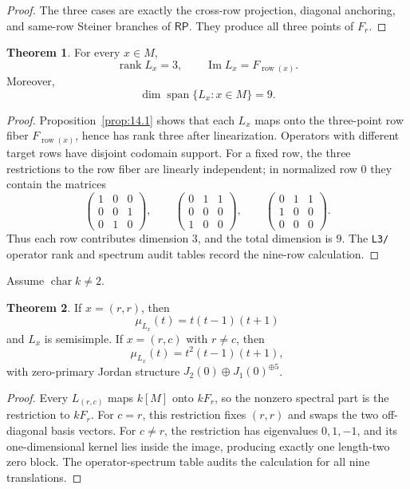 \documentclass[11pt]{article}
\theoremstyle{definition}
\newtheorem{theorem}{Theorem}[section]
\newcommand{\RP}{\mathsf{RP}}
\begin{document}
\begin{proof}
The three cases are exactly the cross-row projection, diagonal anchoring, and
same-row Steiner branches of \(\RP\).  They produce all three points of
\(F_r\).
\end{proof}

\begin{theorem}
\label{thm:14.2}
For every \(x\in M\),
\[
\operatorname{rank}L_x=3,
\qquad
\operatorname{Im}L_x=F_{\operatorname{row}(x)}.
\]
Moreover,
\[
\dim\operatorname{span}\{L_x:x\in M\}=9.
\]
\end{theorem}

\begin{proof}
Proposition~\ref{prop:14.1} shows that each \(L_x\) maps onto the three-point
row fiber \(F_{\operatorname{row}(x)}\), hence has rank three after
linearization.  Operators with different target rows have disjoint codomain
support.  For a fixed row, the three restrictions to the row fiber are
linearly independent; in normalized row \(0\) they contain the matrices
\[
\begin{pmatrix}1&0&0\\0&0&1\\0&1&0\end{pmatrix},
\qquad
\begin{pmatrix}0&1&1\\0&0&0\\1&0&0\end{pmatrix},
\qquad
\begin{pmatrix}0&1&1\\1&0&0\\0&0&0\end{pmatrix}.
\]
Thus each row contributes dimension \(3\), and the total dimension is \(9\).
The \texttt{L3/} operator rank and spectrum audit tables record the nine-row
calculation.
\end{proof}

Assume \(\operatorname{char}k\ne2\).

\begin{theorem}
\label{thm:14.3}
If \(x=(r,r)\), then
\[
\mu_{L_x}(t)=t(t-1)(t+1)
\]
and \(L_x\) is semisimple.  If \(x=(r,c)\) with \(r\ne c\), then
\[
\mu_{L_x}(t)=t^2(t-1)(t+1),
\]
with zero-primary Jordan structure \(J_2(0)\oplus J_1(0)^{\oplus5}\).
\end{theorem}

\begin{proof}
Every \(L_{(r,c)}\) maps \(k[M]\) onto \(kF_r\), so the nonzero spectral
part is the restriction to \(kF_r\).  For \(c=r\), this restriction fixes
\((r,r)\) and swaps the two off-diagonal basis vectors.  For \(c\ne r\),
the restriction has eigenvalues \(0,1,-1\), and its one-dimensional kernel
lies inside the image, producing exactly one length-two zero block.  The
operator-spectrum table audits the calculation for all nine translations.
\end{proof}
\end{document}
